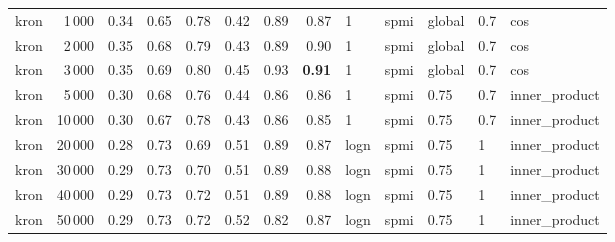 \begin{tabular}{lrrrrrrrlllll}
    kron &            1\,000 &       0.34 &  0.65 &  0.78 &  0.42 &       0.89 &       0.87 &     1 &   spmi &  global &  0.7 &            cos \\
    kron &            2\,000 &       0.35 &  0.68 &  0.79 &  0.43 &       0.89 &       0.90 &     1 &   spmi &  global &  0.7 &            cos \\
    kron &            3\,000 &       0.35 &  0.69 &  0.80 &  0.45 &       0.93 &       \textbf{0.91} &     1 &   spmi &  global &  0.7 &            cos \\
    kron &            5\,000 &       0.30 &  0.68 &  0.76 &  0.44 &       0.86 &       0.86 &     1 &   spmi &    0.75 &  0.7 &  inner\_product \\
    kron &           10\,000 &       0.30 &  0.67 &  0.78 &  0.43 &       0.86 &       0.85 &     1 &   spmi &    0.75 &  0.7 &  inner\_product \\
    kron &           20\,000 &       0.28 &  0.73 &  0.69 &  0.51 &       0.89 &       0.87 &  logn &   spmi &    0.75 &    1 &  inner\_product \\
    kron &           30\,000 &       0.29 &  0.73 &  0.70 &  0.51 &       0.89 &       0.88 &  logn &   spmi &    0.75 &    1 &  inner\_product \\
    kron &           40\,000 &       0.29 &  0.73 &  0.72 &  0.51 &       0.89 &       0.88 &  logn &   spmi &    0.75 &    1 &  inner\_product \\
    kron &           50\,000 &       0.29 &  0.73 &  0.72 &  0.52 &       0.82 &       0.87 &  logn &   spmi &    0.75 &    1 &  inner\_product \\
\bottomrule
\end{tabular}

